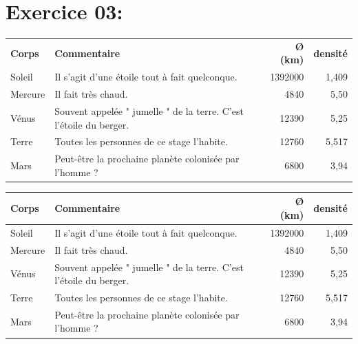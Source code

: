 \documentclass[16pt]{article}
\begin{document}
\section*{Exercice 03:}
\begin{center}
\begin{tabular}{lp{4cm}rr}
\textbf{Corps} & \textbf{Commentaire} & \textbf{Ø (km)} & \textbf{densité} \\
Soleil & Il s'agit d'une étoile tout à fait quelconque. & 1392000 & 1,409 \\
Mercure & Il fait très chaud. & 4840 & 5,50 \\
Vénus & Souvent appelée " jumelle " de la terre. C'est l'étoile du berger. & 12390 & 5,25 \\
Terre & Toutes les personnes de ce stage l'habite. & 12760 & 5,517 \\
Mars & Peut-être la prochaine planète colonisée par l'homme ? & 6800 & 3,94 \\
\end{tabular}
\end{center}



\begin{center}
\begin{tabular}{|l|>{\raggedright\arraybackslash}p{4cm}|r|r|}
\hline
\textbf{Corps} & \textbf{Commentaire} & \textbf{Ø (km)} & \textbf{densité} \\
\hline \hline
Soleil & Il s'agit d'une étoile tout à fait quelconque. & 1392000 & 1,409 \\
\hline
Mercure & Il fait très chaud. & 4840 & 5,50 \\
Vénus & Souvent appelée " jumelle " de la terre. C'est l'étoile du berger. & 12390 & 5,25 \\
Terre & Toutes les personnes de ce stage l'habite. & 12760 & 5,517 \\
Mars & Peut-être la prochaine planète colonisée par l'homme ? & 6800 & 3,94 \\
\hline
\end{tabular}
\end{center}
\end{document}
